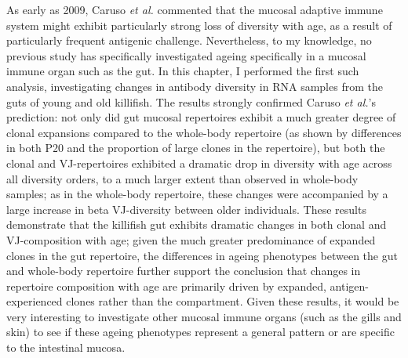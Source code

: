 
As early as 2009, Caruso \textit{et al.} \parencite{caruso2009immunosenescence} commented that the mucosal adaptive immune system might exhibit particularly strong loss of diversity with age, as a result of particularly frequent antigenic challenge. Nevertheless, to my knowledge, no previous study has specifically investigated ageing specifically in a mucosal immune organ such as the gut. In this chapter, I performed the first such analysis, investigating changes in antibody diversity in RNA samples from the guts of young and old killifish. The results strongly confirmed Caruso \textit{et al.}'s prediction: not only did gut mucosal repertoires exhibit a much greater degree of clonal expansions compared to the whole-body repertoire (as shown by differences in both P20 and the proportion of large clones in the repertoire), but both the clonal and VJ-repertoires exhibited a dramatic drop in diversity with age across all diversity orders, to a much larger extent than observed in whole-body samples; as in the whole-body repertoire, these changes were accompanied by a large increase in beta VJ-diversity between older individuals. These results demonstrate that the killifish gut exhibits dramatic changes in both clonal and VJ-composition with age; given the much greater predominance of expanded clones in the gut repertoire, the differences in ageing phenotypes between the gut and whole-body repertoire further support the conclusion that changes in repertoire composition with age are primarily driven by expanded, antigen-experienced clones rather than the \naive compartment. Given these results, it would be very interesting to investigate other mucosal immune organs (such as the gills and skin) to see if these ageing phenotypes represent a general pattern or are specific to the intestinal mucosa.





